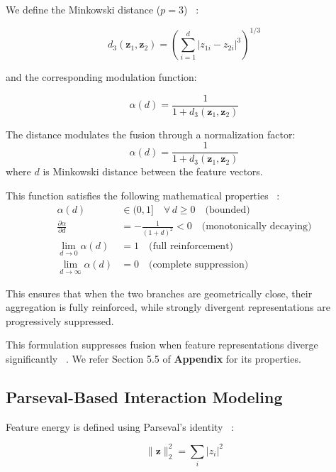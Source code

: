 \documentclass[preprint,12pt]{elsarticle}
\begin{document}
We define the Minkowski distance ($p=3$) ~\cite{b6}:

\begin{equation*}
d_3(\mathbf{z}_1, \mathbf{z}_2)
=
\left( \sum_{i=1}^{d} |z_{1i} - z_{2i}|^3 \right)^{1/3}
\end{equation*}

and the corresponding modulation function:

\begin{equation*}
\alpha(d) = \frac{1}{1 + d_3(\mathbf{z}_1, \mathbf{z}_2)}
\end{equation*}

The distance modulates the fusion through a normalization factor:
\begin{equation*}
    \alpha(d) = \frac{1}{1 + d_3(\mathbf{z}_1, \mathbf{z}_2)}
\end{equation*}
where $d$ is Minkowski distance between the feature vectors.

This function satisfies the following mathematical properties ~\cite{b32}: 
\begin{align*}
    \alpha(d) &\in (0, 1] \quad \forall \, d \geq 0 \quad \text{(bounded)} \\
    \frac{\partial \alpha}{\partial d} &= -\frac{1}{(1+d)^2} < 0 \quad \text{(monotonically decaying)} \\
    \lim_{d \to 0} \alpha(d) &= 1 \quad \text{(full reinforcement)} \\
    \lim_{d \to \infty} \alpha(d) &= 0 \quad \text{(complete suppression)}
\end{align*}

This ensures that when the two branches are geometrically close, their aggregation is fully reinforced, while strongly divergent representations are progressively suppressed.

This formulation suppresses fusion when feature representations diverge significantly ~\cite{b7}. We refer Section 5.5 of \textbf{Appendix} for its properties.

\subsection{Parseval-Based Interaction Modeling}

Feature energy is defined using Parseval's identity ~\cite{b8}:

\begin{equation*}
\|\mathbf{z}\|_2^2 = \sum_i |z_i|^2
\end{equation*}
\end{document}

